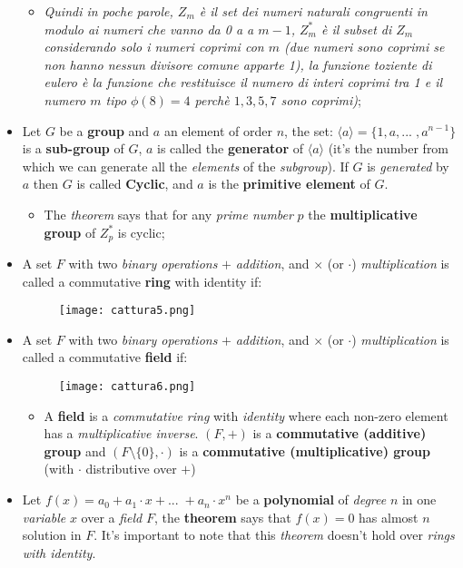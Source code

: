 \documentclass{article}
\begin{document}
\begin{itemize}
\begin{itemize}
\begin{itemize}
\end{itemize}
\item \emph{Quindi in poche parole, $Z_m$ è il set dei numeri naturali congruenti in modulo ai numeri che vanno da 0 a a $m-1$, $Z_m^{*}$ è il subset di $Z_m$ considerando solo i numeri coprimi con $m$ (due numeri sono coprimi se non hanno nessun divisore comune apparte 1), 
la funzione toziente di eulero è la funzione che restituisce il numero di interi coprimi tra 1 e il numero $m$ tipo $\phi(8)=4$ perchè $1,3,5,7$ sono coprimi)};
\end{itemize}
\item Let $G$ be a \textbf{group} and $a$ an element of order $n$, the set: $ \langle a \rangle = \{ 1,a,...\;,a^{n-1} \}$ is a \textbf{sub-group} of $G$, $a$ is called the \textbf{generator} of $\langle a \rangle$ (it's the number from which we can generate all the \emph{elements} of the \emph{subgroup}). If $G$ is \emph{generated} by $a$ then $G$ is called \textbf{Cyclic}, and $a$ is the \textbf{primitive element} of $G$. 
\begin{itemize}
\item The \emph{theorem} says that for any \emph{prime number} $p$ the \textbf{multiplicative group} of $Z_p^*$ is cyclic; 
\end{itemize}
\item A set $F$ with two \emph{binary operations} $+$ \emph{addition}, and $\times$ (or $\cdot$) \emph{multiplication} is called a commutative \textbf{ring} with identity if:
\begin{figure}[H]
  \centering
  \texttt{[image: cattura5.png]}
\end{figure}
\item A set $F$ with two \emph{binary operations} $+$ \emph{addition}, and $\times$ (or $\cdot$) \emph{multiplication} is called a commutative \textbf{field} if:
\begin{figure}[H]
  \centering
  \texttt{[image: cattura6.png]}
\end{figure}
\begin{itemize}
\item A \textbf{field} is a \emph{commutative ring} with \emph{identity} where each non-zero element has a \emph{multiplicative inverse}. $(F,+)$ is a \textbf{commutative (additive) group} and $(F \setminus \{0\}, \cdot)$ is a \textbf{commutative (multiplicative) group} (with $\cdot$ distributive over $+$)
\end{itemize}
\item Let $f(x) = a_0 + a_1 \cdot x + ...\; + a_n \cdot x^n$ be a \textbf{polynomial} of \emph{degree} $n$ in one \emph{variable} $x$ over a \emph{field} $F$, the \textbf{theorem} says that $f(x) = 0$ has almost $n$ solution in $F$. It's important to note that this \emph{theorem} doesn't hold over \emph{rings with identity}. 

\end{itemize}
\end{document}
